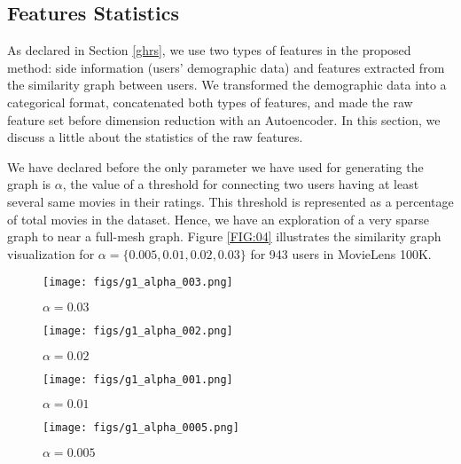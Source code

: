 \documentclass[a4paper,fleqn]{cas-dc}
\begin{document}
\subsection{Features Statistics}
\label{statistics}
As declared in Section \ref{ghrs}, we use two types of features in the proposed method: side information (users' demographic data) and features extracted from the similarity graph between users. We transformed the demographic data into a categorical format, concatenated both types of features, and made the raw feature set before dimension reduction with an Autoencoder. In this section, we discuss a little about the statistics of the raw features.

We have declared before the only parameter we have used for generating the graph is $\alpha$, the value of a threshold for connecting two users having at least several same movies in their ratings. This threshold is represented as a percentage of total movies in the dataset. Hence, we have an exploration of a very sparse graph to near a full-mesh graph. Figure \ref{FIG:04} illustrates the similarity graph visualization for $\alpha=\{0.005, 0.01, 0.02, 0.03\}$ for 943 users in MovieLens 100K.

\begin{figure*}

	\centering
	\begin{subfigure}{0.23\textwidth}
		\centering
		\texttt{[image: figs/g1\_alpha\_003.png]}
		\caption{$\alpha=0.03$}
		\label{FIG:04:a}
	\end{subfigure}
	\begin{subfigure}{0.23\textwidth}
		\centering
		\texttt{[image: figs/g1\_alpha\_002.png]}
		\caption{$\alpha=0.02$}
		\label{FIG:04:b}
	\end{subfigure}
	\begin{subfigure}{0.23\textwidth}
		\centering
		\texttt{[image: figs/g1\_alpha\_001.png]}
		\caption{$\alpha=0.01$}
		\label{FIG:04:c}
	\end{subfigure}
	\begin{subfigure}{0.23\textwidth}
		\centering
		\texttt{[image: figs/g1\_alpha\_0005.png]}
		\caption{$\alpha=0.005$}
		\label{FIG:04:d}
	\end{subfigure}

	\caption{Visualization of Similarity Graph for $\alpha=\{0.005, 0.01, 0.02, 0.03\}$ for MovieLens 100K with 943 users.}
	\label{FIG:04}
\end{figure*}
\end{document}
